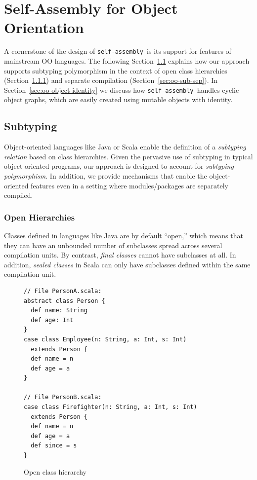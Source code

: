 \documentclass[preprint,nocopyrightspace]{sigplanconf}
\newcommand{\selfassembly}{\texttt{self-assembly~}}
\begin{document}
\section{Self-Assembly for Object Orientation}\label{sec:oo}

A cornerstone of the design of \selfassembly is its support for features of mainstream
OO languages. The following Section~\ref{sec:oo-sub} explains how our approach supports
subtyping polymorphism in the context of open class hierarchies (Section~\ref{sec:oo-sub-open})
and separate compilation (Section~\ref{sec:oo-sub-sep}). In Section~\ref{sec:oo-object-identity}
we discuss how \selfassembly handles cyclic object graphs, which are easily created
using mutable objects with identity.


\subsection{Subtyping}\label{sec:oo-sub}

Object-oriented languages like Java or Scala enable the definition of a
\emph{subtyping relation} based on class hierarchies. Given the pervasive use
of subtyping in typical object-oriented programs, our approach is designed to
account for \emph{subtyping polymorphism}. In addition, we provide mechanisms
that enable the object-oriented features even in a setting where
modules/packages are separately compiled.

\subsubsection{Open Hierarchies}\label{sec:oo-sub-open}

Classes defined in languages like Java are by default ``open,'' which means
that they can have an unbounded number of subclasses spread across several
compilation units. By contrast, \emph{final classes} cannot have subclasses at
all. In addition, \emph{sealed classes} in Scala can only have subclasses
defined within the same compilation unit.

\begin{figure}
\centering
\begin{lstlisting}
// File PersonA.scala:
abstract class Person {
  def name: String
  def age: Int
}
case class Employee(n: String, a: Int, s: Int)
  extends Person {
  def name = n
  def age = a
}

// File PersonB.scala:
case class Firefighter(n: String, a: Int, s: Int)
  extends Person {
  def name = n
  def age = a
  def since = s
}
\end{lstlisting}
  \caption{Open class hierarchy}
  \label{fig:class-hierarchy}
\end{figure}
\end{document}
